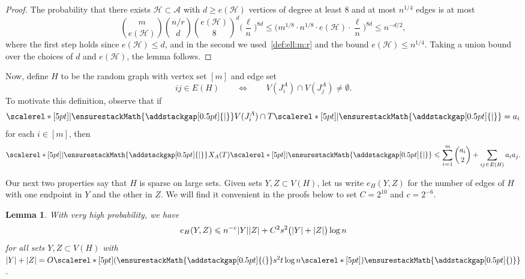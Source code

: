\documentclass[12pt,reqno]{amsart}
\newcommand\pig[1]{\scalerel*[5pt]{\normalsize#1}{%
  \ensurestackMath{\addstackgap[0.5pt]{\normalsize#1}}}}
\newtheorem{lemma}[theorem]{Lemma}
\theoremstyle{remark}
\numberwithin{theorem}{section}
\renewcommand{\(}{\bigl(}
\renewcommand{\)}{\bigr)\vphantom{)}}
\newcommand{\gap}{\hspace{0.02cm}}
\newcommand{\ina}{\hspace{0.02cm}\in\hspace{0.02cm}}
\newcommand{\eqa}{\hspace{0.02cm}=\hspace{0.015cm}}
\newcommand{\cA}{\mathcal A}
\newcommand{\cH}{\mathcal H}
\newcommand{\cJ}{\mathcal J}
\renewcommand{\le}{\leqslant}
\renewcommand{\ge}{\geqslant}
\begin{document}
\begin{proof}
The probability that there exists $\cH \subset \cA$ with $d \ge e(\cH)$ vertices of degree at least $8$ and at most $n^{1/4}$ edges is at most
$${m \choose e(\cH)} {n/r \choose d} {e(\cH) \choose 8}^d \bigg( \frac{\ell}{n} \bigg)^{8d} \le \bigg( m^{1/8} \cdot n^{1/8} \cdot e(\cH) \cdot \frac{\ell}{n} \bigg)^{8d} \le n^{-d/2},$$
where the first step holds since $e(\cH) \le d$, and in the second we used~\eqref{def:ell:m:r} and the bound $e(\cH) \le n^{1/4}$. Taking a union bound over the choices of $d$ and $e(\cH)$, the lemma follows. 
\end{proof}

Now, define $H$ to be the random graph with vertex set $[m]$ %
and edge set
$$ij \in E(H) \qquad \Leftrightarrow \qquad V(J_i^A) \cap V(J_j^A) \ne \emptyset.$$
To motivate this definition, observe that if
$$\pig| V(J^A_i) \cap T \pig| = a_i$$
for each $i \in [m]$, then
\begin{equation}\label{eq:XAT:basic:bound} 
\pig| \hspace{0.015cm} X_A(T) \pig| \le \hspace{0.02cm} \sum_{i \eqa 1}^m {a_i \choose 2} + \sum_{ij \ina E(H)} a_i a_j.
\end{equation}

Our next two properties say that $H$ is sparse on large sets. Given 
sets $Y,Z \subset V(H)$, let us write $e_H(Y,Z)$ for the number of edges of $H$ with one endpoint in $Y$ and the other in $Z$. We will find it convenient in the proofs below to set $C = 2^{10}$ and $c = 2^{-6}$. 

\begin{lemma}\label{lem:intersection:sparse}
With very high probability, we have
\begin{equation}\label{eq:intersection}
e_H(Y,Z) \le n^{-c} \gap |Y| |Z| + C^2 s^2 \big( |Y| + |Z| \big) \log n 
\end{equation}
for all sets $Y,Z \subset V(H)$ with $|Y| + |Z| = O\pig( s^2 t \log n \pig)$. 
\end{lemma}
\end{document}
